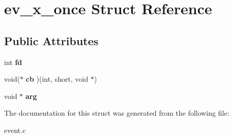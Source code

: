 \hypertarget{structev__x__once}{}\section{ev\+\_\+x\+\_\+once Struct Reference}
\label{structev__x__once}
\subsection*{Public Attributes}
\begin{DoxyCompactItemize}
\item 
\hypertarget{structev__x__once_ad8bab46828192f0962c4c5b523cff7ef}{}\label{structev__x__once_ad8bab46828192f0962c4c5b523cff7ef} 
int {\bfseries fd}
\item 
\hypertarget{structev__x__once_ab55a59ff9bdf70da8f0c6d717ae27b72}{}\label{structev__x__once_ab55a59ff9bdf70da8f0c6d717ae27b72} 
void($\ast$ {\bfseries cb} )(int, short, void $\ast$)
\item 
\hypertarget{structev__x__once_a982a915afeeacdbcf2612bd6da70a2eb}{}\label{structev__x__once_a982a915afeeacdbcf2612bd6da70a2eb} 
void $\ast$ {\bfseries arg}
\end{DoxyCompactItemize}


The documentation for this struct was generated from the following file\+:\begin{DoxyCompactItemize}
\item 
event.\+c\end{DoxyCompactItemize}

